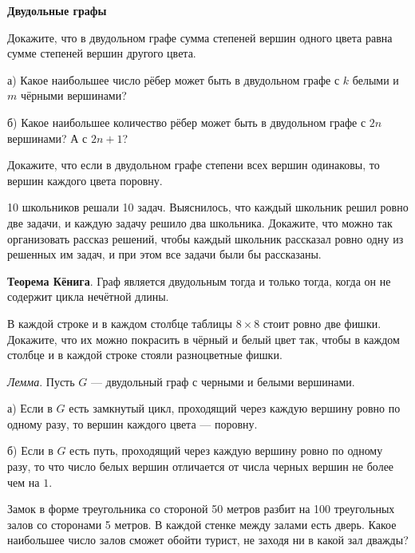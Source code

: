 \documentclass{article}
\begin{document}
    \large

    \begin{center}
        \textbf{Двудольные графы}
    \end{center}
    
    \begin{enumerate_boxed}

        \item Докажите, что в двудольном графе сумма степеней вершин одного цвета равна сумме степеней вершин другого цвета.

        \item а) Какое наибольшее число рёбер может быть в двудольном графе с $k$ белыми и $m$ чёрными вершинами?

        б) Какое наибольшее количество рёбер может быть в двудольном графе с $2n$ вершинами?
        А с $2n + 1$?

        \item Докажите, что если в двудольном графе степени всех вершин одинаковы, то вершин каждого цвета поровну.

        \item 10 школьников решали 10 задач.
        Выяснилось, что каждый школьник решил ровно две задачи, и каждую задачу решило два школьника.
        Докажите, что можно так организовать рассказ решений, чтобы каждый школьник рассказал ровно одну из решенных им задач, и при этом все задачи были бы рассказаны.

        \item \textbf{Теорема Кёнига}.
        Граф является двудольным тогда и только тогда, когда он не содержит цикла нечётной длины.

        \item В каждой строке и в каждом столбце таблицы $8 \times 8$ стоит ровно две фишки.
        Докажите, что их можно покрасить в чёрный и белый цвет так, чтобы в каждом столбце и в каждой строке стояли разноцветные фишки.

        \item \textit{Лемма}.
        Пусть $G$ — двудольный граф с черными и белыми вершинами.

        а) Если в $G$ есть замкнутый цикл, проходящий через каждую вершину ровно по одному разу, то вершин каждого цвета — поровну.

        б) Если в $G$ есть путь, проходящий через каждую вершину ровно по одному разу, то что число белых вершин отличается от числа черных вершин не более чем на $1$.

        \item Замок в форме треугольника со стороной 50 метров разбит на 100 треугольных залов со сторонами 5 метров.
        В каждой стенке между залами есть дверь.
        Какое наибольшее число залов сможет обойти турист, не заходя ни в какой зал дважды?


\end{enumerate_boxed}
\end{document}
